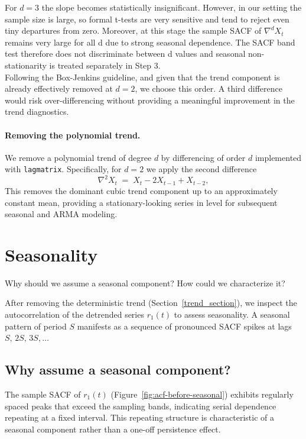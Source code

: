\documentclass[11pt, a4paper]{article}
\begin{document}
For $d=3$ the slope becomes statistically insignificant. However, in our setting the sample size is large, so formal t-tests are very sensitive and tend to reject even tiny departures from zero. Moreover, at this stage the sample SACF of $\nabla^d X_t$ remains very large for all d due to strong seasonal dependence. The SACF band test therefore does not discriminate between d values and seasonal non-stationarity is treated separately in Step 3.\\

Following the Box-Jenkins guideline, and given that the trend component is already effectively removed at $d=2$, we choose this order. A third difference would risk over-differencing without providing a meaningful improvement in the trend diagnostics.

\paragraph{Removing the polynomial trend.} 
We remove a polynomial trend of degree $d$ by differencing of order $d$ implemented with \texttt{lagmatrix}. Specifically, for $d=2$ we apply the second difference
\[
\nabla^2 X_t \;=\; X_t - 2 X_{t-1} + X_{t-2},
\]
This removes the dominant cubic trend component up to an approximately constant mean, providing a stationary-looking series in level for subsequent seasonal and ARMA modeling.


\section{Seasonality} \label{seasonality_section}

\begin{questionbox}
    Why should we assume a seasonal component? How could we characterize it?
\end{questionbox}

After removing the deterministic trend (Section~\ref{trend_section}), we inspect the autocorrelation of the detrended series $r_1(t)$ to assess seasonality. A seasonal pattern of period $S$ manifests as a sequence of pronounced SACF spikes at lags $S,\,2S,\,3S,\ldots$

\subsection{Why assume a seasonal component?}

The sample SACF of $r_1(t)$ (Figure~\ref{fig:acf-before-seasonal}) exhibits regularly spaced peaks that exceed the sampling bands, indicating serial dependence repeating at a fixed interval. This repeating structure is characteristic of a seasonal component rather than a one-off persistence effect.
\end{document}
